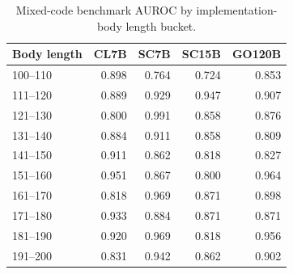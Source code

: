 \begin{table}[t]
\centering\scriptsize
\caption{Mixed-code benchmark AUROC by implementation-body length bucket.}
\label{tab:mixedcode-auroc-by-bucket}
\begin{tabular}{lrrrr}
\toprule
Body length & CL7B & SC7B & SC15B & GO120B \\
\midrule
100--110 & 0.898 & 0.764 & 0.724 & 0.853 \\
111--120 & 0.889 & 0.929 & 0.947 & 0.907 \\
121--130 & 0.800 & 0.991 & 0.858 & 0.876 \\
131--140 & 0.884 & 0.911 & 0.858 & 0.809 \\
141--150 & 0.911 & 0.862 & 0.818 & 0.827 \\
151--160 & 0.951 & 0.867 & 0.800 & 0.964 \\
161--170 & 0.818 & 0.969 & 0.871 & 0.898 \\
171--180 & 0.933 & 0.884 & 0.871 & 0.871 \\
181--190 & 0.920 & 0.969 & 0.818 & 0.956 \\
191--200 & 0.831 & 0.942 & 0.862 & 0.902 \\
\bottomrule
\end{tabular}
\end{table}
